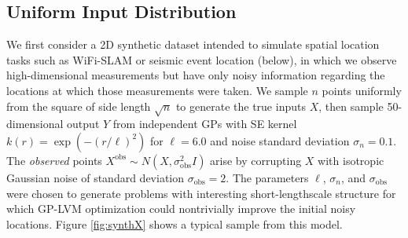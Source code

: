 \documentclass{article}
\begin{document}
\subsection{Uniform Input Distribution}
\vspace{-0.1cm}
We first consider a 2D synthetic dataset intended to simulate spatial location tasks such as WiFi-SLAM
\cite{ferris2007wifi} or seismic event location (below), in which we
observe high-dimensional measurements but have only noisy information
regarding the locations at which those measurements were
taken. We sample $n$ points uniformly from the square of side length
$\sqrt{n}$ to generate the true inputs $X$, then sample 50-dimensional output $Y$ from independent GPs
with SE kernel $k(r) = \exp(-(r/\ell)^2)$ for $\ell=6.0$ and noise standard deviation
$\sigma_n = 0.1$. The {\em observed} points
$X^\text{obs} \sim N(X, \sigma^2_\text{obs}I)$ arise by corrupting $X$ with
isotropic Gaussian noise of standard deviation
$\sigma_\text{obs}=2$. The parameters $\ell$, $\sigma_n$, and
$\sigma_\text{obs}$ were chosen to generate problems with
interesting short-lengthscale structure for which
GP-LVM optimization could nontrivially improve the initial noisy locations. Figure \ref{fig:synthX} shows a typical sample from this model.
\end{document}
